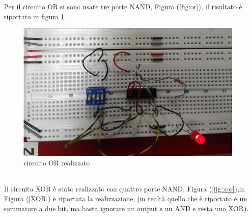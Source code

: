 \documentclass[10pt,a4paper]{article}
\begin{document}
Per il circuito OR  si sono usate tre porte NAND, Figura (\ref{fig:or}), il risultato è riportato in figura \ref{OR}.
\begin{figure}[h]
	\centering
	\includegraphics[scale=0.07]{20190221_170024.jpg}
	\caption{circuito OR realizzato}
	\label{OR}
\end{figure}
\\


Il circuito XOR  è stato realizzato con quattro porte NAND, Figura (\ref{fig:xor}),in Figura (\ref{XOR})  è riportata la realizzazione, (in realtà quello che è riportato è un sommatore a due bit, ma basta ignorare un output e un AND e resta uno XOR).
\end{document}
